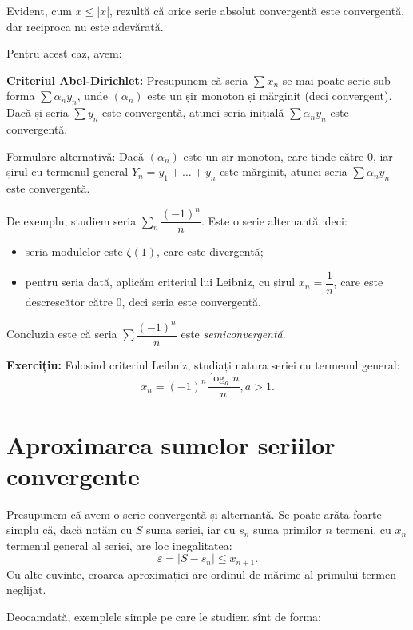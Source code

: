 Evident, cum $ x \leq |x| $, rezultă că orice serie absolut convergentă este
convergentă, dar reciproca nu este adevărată.

Pentru acest caz, avem:

\textbf{Criteriul Abel-Dirichlet:} Presupunem că seria $ \sum x_n $ se mai poate
scrie sub forma $ \sum \alpha_n y_n $, unde $ (\alpha_n) $ este un șir monoton
și mărginit (deci convergent). Dacă și seria $ \sum y_n $ este convergentă,
atunci seria inițială $ \sum \alpha_n y_n $ este convergentă.

Formulare alternativă: Dacă $ (\alpha_n) $ este un șir monoton, care tinde
către 0, iar șirul cu termenul general $ Y_n = y_1 + \dots + y_n $ este
mărginit, atunci seria $ \sum \alpha_n y_n $ este convergentă.

De exemplu, studiem seria $ \sum_n \dfrac{(-1)^n}{n} $. Este o serie
alternantă, deci:
\begin{itemize}
    \item seria modulelor este $ \zeta(1) $, care este divergentă;
    \item pentru seria dată, aplicăm criteriul lui Leibniz, cu șirul $ x_n = \dfrac{1}{n} $,
        care este descrescător către 0, deci seria este convergentă.
\end{itemize}

Concluzia este că seria $ \sum \dfrac{(-1)^n}{n} $ este \emph{semiconvergentă}.

\textbf{Exercițiu:} Folosind criteriul Leibniz, studiați natura seriei cu termenul general:
\[
    x_n = (-1)^n \dfrac{\log_a n}{n}, a > 1.
\]

\section{Aproximarea sumelor seriilor convergente}

Presupunem că avem o serie convergentă și alternantă. Se poate arăta foarte
simplu că, dacă notăm cu $ S $ suma seriei, iar cu $ s_n $ suma primilor $ n $
termeni, cu $ x_n $ termenul general al seriei, are loc inegalitatea:
\begin{equation}\label{eq:aprox}
    \varepsilon = | S - s_n | \leq x_{n + 1}.
\end{equation}
Cu alte cuvinte, eroarea aproximației are ordinul de mărime al primului
termen neglijat.

Deocamdată, exemplele simple pe care le studiem sînt de forma:

